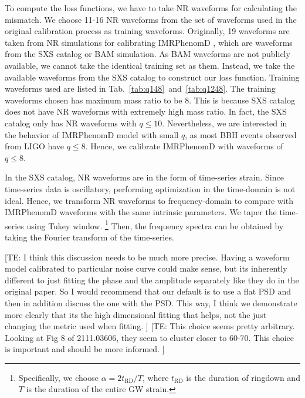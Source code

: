 \documentclass[twocolumn]{aastex631}
\newcommand{\te}[1]{{\color{rr}[TE: #1 ]}}
\begin{document}
To compute the loss functions, we have to take NR waveforms for calculating the mismatch. We choose 11-16 NR waveforms from the set of waveforms used in the original
calibration process as training waveforms. Originally, 19 waveforms are taken from 
NR simulations for calibrating IMRPhenomD \citep{khan2016frequency}, 
which are waveforms from the SXS catalog \citep{boyle2019sxs} or BAM simulation. 
As BAM waveforms are not publicly available, we cannot take the identical training 
set as them. Instead, we take the available waveforms from the SXS catalog to construct our loss function. Training waveforms used are listed in Tab.~\ref{tab:q148}~and~\ref{tab:q1248}. The training waveforms chosen has maximum mass ratio to be 8. This is because SXS catalog does not have NR waveforms with extremely high mass ratio. In fact, the SXS catalog only has NR waveforms with $q\leq10$. Nevertheless, we are interested in the behavior of IMRPhenomD model with small $q$, as most BBH events observed from LIGO have $q\leq8$. Hence, we calibrate IMRPhenomD with waveforms of $q\leq8$. 

In the SXS catalog, NR waveforms are in the form of time-series strain. Since time-series data is oscillatory, performing optimization in the time-domain is not ideal. Hence, we transform NR waveforms to frequency-domain to compare with IMRPhenomD waveforms with the
same intrinsic parameters. We taper the time-series using Tukey window.
\footnote{ Specifically, we choose $\alpha=2t_{\mathrm{RD}}/T$, where
	$t_{\mathrm{RD}}$ is the duration of ringdown and $T$ is the duration of the
	entire GW strain. } 
Then, the frequency spectra can be obtained by taking the Fourier transform of the time-series.

\te{I think this discussion needs to be much more precise. Having a waveform model calibrated to particular noise curve could make sense, but its inherently different to just fitting the phase and the amplitude separately like they do in the original paper. So I would recommend that our default is to use a flat PSD and then in addition discuss the one with the PSD. This way, I think we demonstrate more clearly that its the high dimensional fitting that helps, not the just changing the metric used when fitting.}
\te{This choice seems pretty arbitrary. Looking at Fig 8 of 2111.03606, they seem to cluster closer to 60-70. This choice is important and should be more informed.}
\end{document}
